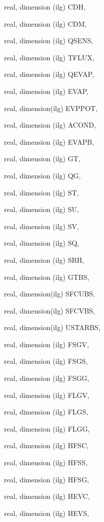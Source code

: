 {\begin{DoxyParamCaption}
\item[{real, dimension   (ilg)}]{C\+D\+H, }
\item[{real, dimension   (ilg)}]{C\+D\+M, }
\item[{real, dimension (ilg)}]{Q\+S\+E\+N\+S, }
\item[{real, dimension (ilg)}]{T\+F\+L\+U\+X, }
\item[{real, dimension (ilg)}]{Q\+E\+V\+A\+P, }
\item[{real, dimension  (ilg)}]{E\+V\+A\+P, }
\item[{real, dimension(ilg)}]{E\+V\+P\+P\+O\+T, }
\item[{real, dimension (ilg)}]{A\+C\+O\+N\+D, }
\item[{real, dimension (ilg)}]{E\+V\+A\+P\+B, }
\item[{real, dimension    (ilg)}]{G\+T, }
\item[{real, dimension    (ilg)}]{Q\+G, }
\item[{real, dimension    (ilg)}]{S\+T, }
\item[{real, dimension    (ilg)}]{S\+U, }
\item[{real, dimension    (ilg)}]{S\+V, }
\item[{real, dimension    (ilg)}]{S\+Q, }
\item[{real, dimension   (ilg)}]{S\+R\+H, }
\item[{real, dimension  (ilg)}]{G\+T\+B\+S, }
\item[{real, dimension(ilg)}]{S\+F\+C\+U\+B\+S, }
\item[{real, dimension(ilg)}]{S\+F\+C\+V\+B\+S, }
\item[{real, dimension(ilg)}]{U\+S\+T\+A\+R\+B\+S, }
\item[{real, dimension  (ilg)}]{F\+S\+G\+V, }
\item[{real, dimension  (ilg)}]{F\+S\+G\+S, }
\item[{real, dimension  (ilg)}]{F\+S\+G\+G, }
\item[{real, dimension  (ilg)}]{F\+L\+G\+V, }
\item[{real, dimension  (ilg)}]{F\+L\+G\+S, }
\item[{real, dimension  (ilg)}]{F\+L\+G\+G, }
\item[{real, dimension  (ilg)}]{H\+F\+S\+C, }
\item[{real, dimension  (ilg)}]{H\+F\+S\+S, }
\item[{real, dimension  (ilg)}]{H\+F\+S\+G, }
\item[{real, dimension  (ilg)}]{H\+E\+V\+C, }
\item[{real, dimension  (ilg)}]{H\+E\+V\+S, }

\end{DoxyParamCaption}}
